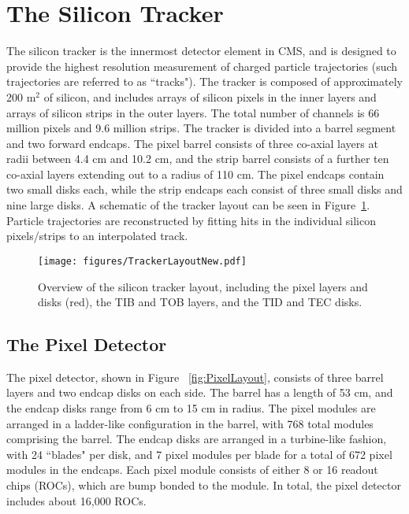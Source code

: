 \section{The Silicon Tracker}

The silicon tracker is the innermost detector element in CMS, and is designed to provide the highest resolution measurement of charged particle trajectories (such trajectories are referred to as ``tracks"). The tracker is composed of approximately 200 m$^{2}$ of silicon, and includes arrays of silicon pixels in the inner layers and arrays of silicon strips in the outer layers. The total number of channels is 66 million pixels and 9.6 million strips.\cite{TDR} The tracker is divided into a barrel segment and two forward endcaps. The pixel barrel consists of three co-axial layers at radii between 4.4 cm and 10.2 cm, and the strip barrel consists of a further ten co-axial layers extending out to a radius of 110 cm. The pixel endcaps contain two small disks each, while the strip endcaps each consist of three small disks and nine large disks. A schematic of the tracker layout can be seen in Figure~\ref{fig:TrackerLayout}. Particle trajectories are reconstructed by fitting hits in the individual silicon pixels/strips to an interpolated track.

\begin{figure}\centering
  \texttt{[image: figures/TrackerLayoutNew.pdf]}
  \caption{\label{fig:TrackerLayout} Overview of the silicon tracker layout, including the pixel layers and disks (red), the TIB and TOB layers, and the TID and TEC disks.}
\end{figure}


\subsection{The Pixel Detector}

The pixel detector, shown in Figure ~\ref{fig:PixelLayout}, consists of three barrel layers and two endcap disks on each side. The barrel has a length of 53 cm, and the endcap disks range from 6 cm to 15 cm in radius. The pixel modules are arranged in a ladder-like configuration in the barrel, with 768 total modules comprising the barrel. The endcap disks are arranged in a turbine-like fashion, with 24 ``blades" per disk, and 7 pixel modules per blade for a total of 672 pixel modules in the endcaps.
Each pixel module consists of either 8 or 16 readout chips (ROCs), which are bump bonded to the module. In total, the pixel detector includes about 16,000 ROCs.\cite{Pixel}

